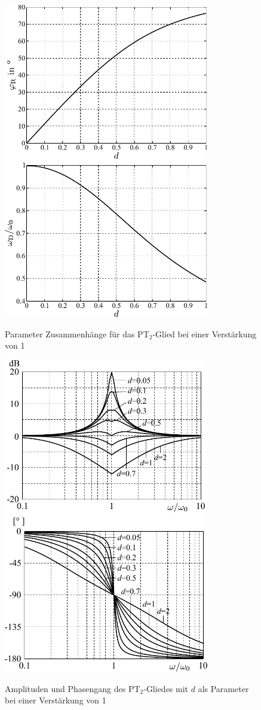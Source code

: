 %
\begin{figure}[h]
	\centering
		\includegraphics[width=0.8\textwidth]{Abbildungen/Anhang/PDF/d_phiR_d_wDw0.pdf}
	\label{fig:d_phiR_d_wDw0}
	\caption{Parameter Zusammenh\"ange f\"ur das PT$_{2}$-Glied bei einer Verstärkung von 1}
\end{figure}
%
\begin{figure}[h]
	\centering
	\includegraphics[width=0.8\textwidth]{Abbildungen/Anhang/PDF/KDVZ2.pdf}
	\label{fig:kdvz2}
	\caption{Amplituden und Phasengang des PT$_{2}$-Gliedes mit $d$ als Parameter bei einer Verstärkung von 1}
\end{figure}
